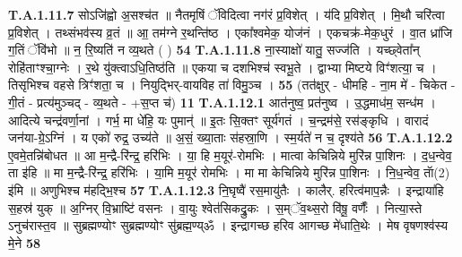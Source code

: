 \documentclass[17pt]{extarticle}
\begin{document}
                                                                  \textbf{ T.A.1.11.7} \newline
                  सोऽजि॑ह्वो अ॒सश्च॑त ॥ नैतमृषिं ॅविदित्वा नग॑रं प्र॒विशेत् । य॑दि प्र॒विशेत् । मि॒थौ चरि॑त्वा प्र॒विशेत् । तथ्संभव॑स्य व्र॒तं ॥ आ॒ तम॑ग्ने र॒थन्ति॑ष्ठ । एका᳚श्वमेक॒ योज॑नं । एकचक्र॑-मेक॒धुरं ।  वा॒त ध्रा॑जि ग॒तिं ॅवि॑भो ॥ न॒ रि॒ष्यति॑ न व्य॒थते ( ) \textbf{ 54} \newline
                  \newline
                                                                  \textbf{ T.A.1.11.8} \newline
                  ना॒स्याक्षो॑ यातु॒ सज्ज॑ति । यच्छ्वेता᳚न् रोहि॑ताꣳश्चा॒ग्नेः । र॒थे यु॑क्त्वाऽधि॒तिष्ठ॑ति ॥ एकया च दशभिश्च॑ स्वभू॒ते । द्वाभ्या मिष्टये विꣳ॑शत्या॒ च । तिसृभिश्च वहसे त्रिꣳ॑शता॒ च ।  नियुद्भिर्-वायविह ता॑ विमु॒ञ्च । \textbf{ 55} \newline
                  \newline
                                                        (तत॑क्षुर् - धीमहि - ना॒म मे॑ - चिकेत - गी॒तं - प्रत्य॑मुञ्चद् - व्य॒थते - +स॒प्त च॑) \textbf{11} \newline \newline
                                \textbf{ T.A.1.12.1} \newline
                  आत॑नुष्व॒ प्रत॑नुष्व । उ॒द्धमाध॑म॒ सन्ध॑म । आदित्ये चन्द्र॑वर्णा॒नां । गर्भ॒ मा धे॑हि॒ यः पुमान्॑ ॥ इ॒तः सि॒क्तꣳ सूर्य॑गतं ।  च॒न्द्रम॑से॒ रस॑ङ्कृधि ।  वारादं जन॑या-ग्रे॒ऽग्निं । य एको॑ रुद्र॒ उच्य॑ते ॥  अ॒सं॒ ख्या॒ताः स॑हस्रा॒णि ।  स्म॒र्यते॑ न च॒ दृश्य॑ते \textbf{ 56} \newline
                  \newline
                                                                  \textbf{ T.A.1.12.2} \newline
                  ए॒वमे॒तन्नि॑बोधत ॥ आ म॒न्द्रै-रि॑न्द्र॒ हरि॑भिः । या॒ हि म॒यूर॑-रोमभिः । मात्वा केचिन्निये मुरि॑न्न पा॒शिनः । द॒ध॒न्वेव॒ ता इ॑हि ॥ मा म॒न्द्रै-रि॑न्द्र॒ हरि॑भिः । या॒मि म॒यूर॑ रोमभिः । मा मा केचिन्निये मुरि॑न्न पा॒शिनः । नि॒ध॒न्वेव॒ ताॅ(2) इ॑मि ॥  अणुभिश्च म॑हद्भि॒श्च \textbf{ 57} \newline
                  \newline
                                                                  \textbf{ T.A.1.12.3} \newline
                  नि॒घृष्वै॑ रस॒मायु॑तैः । कालैर्. हरित्व॑माप॒न्नैः । इन्द्राया॑हि स॒हस्र॑ युक् ॥ अ॒ग्निर् वि॒भ्राष्टि॑ वसनः । वा॒युः श्वेत॑सिकद्रु॒कः । स॒म्ॅव॒थ्स॒रो वि॑षू॒ वर्णैः᳚ । नित्या॒स्ते ऽनुच॑रास्त॒व ॥  सुब्रह्मण्योꣳ सुब्रह्मण्योꣳ सु॑ब्रह्म॒ण्य्ॐ ।  इन्द्रागच्छ हरिव आगच्छ मे॑धाति॒थेः । मेष वृषणश्व॑स्य मे॒ने \textbf{ 58} \newline
\end{document}
